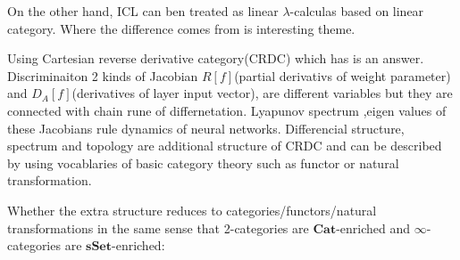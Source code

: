 \documentclass[a4paper,11pt]{article}
\begin{document}
On the other hand, ICL can ben treated as linear \(\lambda\)-calculas based on linear category. Where the difference comes from is interesting theme.

Using Cartesian reverse derivative category(CRDC) which has is an answer\cite{CRDC}. Discriminaiton 2 kinds of Jacobian \(R[f]\)(partial
derivativs of weight parameter) and \(D_A[f]\)(derivatives of layer input vector), are different variables but they are connected with chain
rune of differnetation. Lyapunov spectrum ,eigen values of these Jacobians rule dynamics of neural networks. Differencial structure,
spectrum and topology are additional structure of CRDC and can be described by using vocablaries of basic category theory such as functor or natural transformation.

Whether the extra structure reduces to categories/functors/natural transformations in the same sense that 2-categories are \(\mathbf{Cat}\)-enriched and \(\infty\)-categories are \(\mathbf{sSet}\)-enriched:
\end{document}
